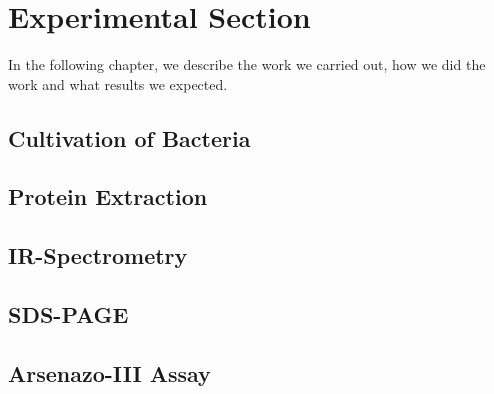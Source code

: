 \chapter{Experimental Section\authorA}

In the following chapter, we describe the work we carried out, how we did the work and what results we expected.

\section{Cultivation of Bacteria}

\section{Protein Extraction}

\section{IR-Spectrometry}

\section{SDS-PAGE}

\section{Arsenazo-III Assay}

